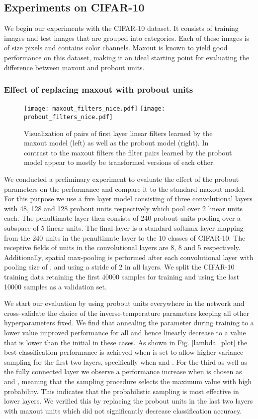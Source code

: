 \documentclass{article} \pdfoutput=1
\begin{document}
\subsection{Experiments on CIFAR-10}
We begin our experiments with the CIFAR-10 \cite{Krizhevsky2009}
dataset. It consists of  training images and  test
images that are grouped into  categories. Each of these images is
of size  pixels and contains  color channels. Maxout is
known to yield good performance on this dataset, making it an ideal
starting point for evaluating the difference between maxout and
probout units.


\subsubsection{Effect of replacing maxout with probout units}
\label{sect_prelim_eval}
\begin{figure}
\centering
\texttt{[image: maxout\_filters\_nice.pdf]}
\quad
\texttt{[image: probout\_filters\_nice.pdf]}
\caption{Visualization of pairs of first layer linear filters learned by the maxout
  model (left) as well as the probout model (right). In contrast to
  the maxout filters the filter pairs learned by the probout model
  appear to mostly be transformed versions of each other.}
\label{filters_fig}
\end{figure}
We conducted a preliminary experiment to evaluate the effect of the
probout parameters  on the performance and compare it to the
standard maxout model. For this purpose we use a five layer model consisting of
three convolutional layers with 48, 128 and 128 probout units
respectively which pool over 2 linear units each. The penultimate
layer then consists of 240 probout units pooling over a subspace of 5
linear units. The final layer is a standard softmax layer mapping from
the 240 units in the penultimate layer to the 10 classes of CIFAR-10.
The receptive fields of units in the convolutional layers are 8, 8 and
5 respectively. Additionally, spatial max-pooling is performed after
each convolutional layer with pooling size of ,  and  using a stride of 2 in all layers.
We split the CIFAR-10 training data retaining the first 40000
samples for training and using the last 10000 samples as a validation
set.

We start our evaluation by using probout units everywhere in the
network and cross-validate the choice of the inverse-temperature
parameters  keeping all
other hyperparameters fixed. We find that annealing the
 parameter during training to a lower value improved
performance for all  and hence linearly decrease
 to a value that is  lower than the initial
 in these cases. As shown in Fig. \ref{lambda_plot} the best
classification performance is achieved when  is set to allow
higher variance sampling for the first two layers, specifically when
 and . For the third as well as
the fully connected layer we observe a performance increase when
 is chosen as  and , meaning that the sampling procedure selects the maximum value with
high probability. This indicates that the probabilistic sampling is
most effective in lower layers.  We verified this by replacing the
probout units in the last two layers with maxout units which did not
significantly decrease classification accuracy.
\end{document}

